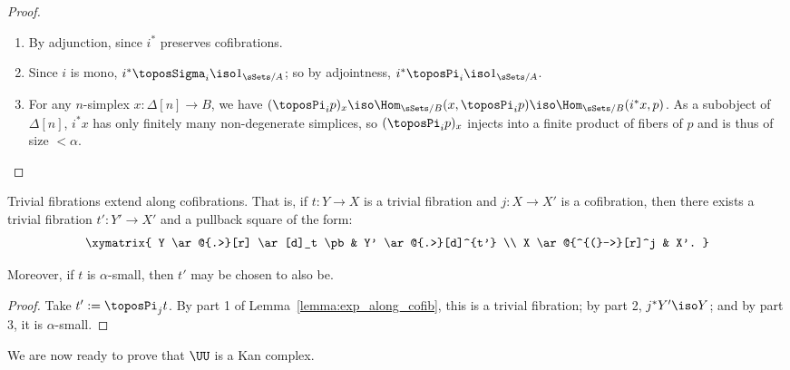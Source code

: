 \begin{proof} \
\begin{enumerate}[1.]
\item By adjunction, since $i^*$ preserves cofibrations.

\item Since $i$ is mono, $i^* \toposSigma_i \iso 1_{\sSets/A}$; so by adjointness, $i^*\toposPi_i \iso 1_{\sSets/A}$.

\item For any $n$-simplex $x \colon \Delta[n] \to B$, we have $(\toposPi_i p)_x \iso \Hom_{\sSets/B}(x,\toposPi_i p) \iso \Hom_{\sSets/B}(i^*x,p)$.  As a subobject of $\Delta[n]$, $i^*x$ has only finitely many non-degenerate simplices, so $(\toposPi_i p)_x$ injects into a finite product of fibers of $p$ and is thus of size $< \alpha$. \qedhere
\end{enumerate} \end{proof}

\begin{lemma} \label{lemma:joyal-lemma}
Trivial fibrations extend along cofibrations.  That is, if $t \colon Y \to X$ is a trivial fibration and $j \colon X \to X'$ is a cofibration, then there exists a trivial fibration $t' \colon Y' \to X'$ and a pullback square of the form:
 \[\xymatrix{ Y \ar@{.>}[r] \ar[d]_t \pb & Y' \ar@{.>}[d]^{t'} \\
 X \ar@{^{(}->}[r]^j & X'.
 }\]

Moreover, if $t$ is $\alpha$-small, then $t'$ may be chosen to also be.
\end{lemma}

\begin{proof}
Take $t' := \toposPi_j t$.  By part 1 of Lemma~\ref{lemma:exp_along_cofib}, this is a trivial fibration; by part 2, $j^*Y' \iso Y$; and by part 3, it is $\alpha$-small.
\end{proof}

We are now ready to prove that $\UU$ is a Kan complex.

